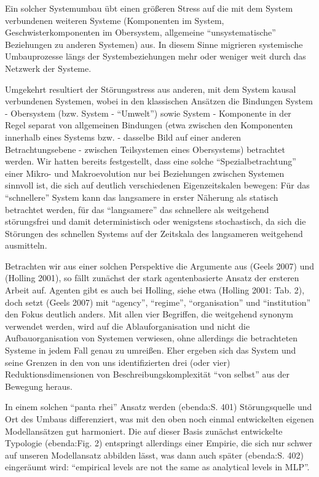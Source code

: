 \documentclass[11pt,a4paper]{article}
\begin{document}
Ein solcher Systemumbau übt einen größeren Stress auf die mit dem System
verbundenen weiteren Systeme (Komponenten im System,
Geschwisterkomponenten im Obersystem, allgemeine ``unsystematische''
Beziehungen zu anderen Systemen) aus. In diesem Sinne migrieren
systemische Umbauprozesse längs der Systembeziehungen mehr oder weniger
weit durch das Netzwerk der Systeme.

Umgekehrt resultiert der Störungsstress aus anderen, mit dem System
kausal verbundenen Systemen, wobei in den klassischen Ansätzen die
Bindungen System - Obersystem (bzw. System - ``Umwelt'') sowie System -
Komponente in der Regel separat von allgemeinen Bindungen (etwa zwischen
den Komponenten innerhalb eines Systems bzw. - dasselbe Bild auf einer
anderen Betrachtungsebene - zwischen Teilsystemen eines Obersystems)
betrachtet werden. Wir hatten bereits festgestellt, dass eine solche
``Spezialbetrachtung'' einer Mikro- und Makroevolution nur bei
Beziehungen zwischen Systemen sinnvoll ist, die sich auf deutlich
verschiedenen Eigenzeitskalen bewegen: Für das ``schnellere'' System
kann das langsamere in erster Näherung als statisch betrachtet werden,
für das ``langsamere'' das schnellere als weitgehend störungsfrei und
damit deterministisch oder wenigstens stochastisch, da sich die
Störungen des schnellen Systems auf der Zeitskala des langsameren
weitgehend ausmitteln.

Betrachten wir aus einer solchen Perspektive die Argumente aus (Geels
2007) und (Holling 2001), so fällt zunächst der stark agentenbasierte
Ansatz der ersteren Arbeit auf. Agenten gibt es auch bei Holling, siehe
etwa (Holling 2001: Tab. 2), doch setzt (Geels 2007) mit ``agency'',
``regime'', ``organisation'' und ``institution'' den Fokus deutlich
anders. Mit allen vier Begriffen, die weitgehend synonym verwendet
werden, wird auf die Ablauforganisation und nicht die Aufbauorganisation
von Systemen verwiesen, ohne allerdings die betrachteten Systeme in
jedem Fall genau zu umreißen. Eher ergeben sich das System und seine
Grenzen in den von uns identifizierten drei (oder vier)
Reduktionsdimensionen von Beschreibungskomplexität ``von selbst'' aus
der Bewegung heraus.

In einem solchen ``panta rhei'' Ansatz werden (ebenda:S. 401)
Störungsquelle und Ort des Umbaus differenziert, was mit den oben noch
einmal entwickelten eigenen Modellansätzen gut harmoniert. Die auf
dieser Basis zunächst entwickelte Typologie (ebenda:Fig. 2) entspringt
allerdings einer Empirie, die sich nur schwer auf unseren Modellansatz
abbilden lässt, was dann auch später (ebenda:S. 402) eingeräumt wird:
``empirical levels are not the same as analytical levels in MLP''.
\end{document}
